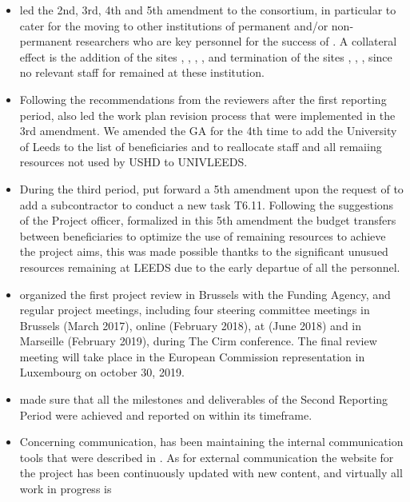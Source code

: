 \begin{itemize}
\item {} led the 2nd, 3rd, 4th and 5th amendment to the consortium,
  in particular to cater for the moving to other institutions of
  permanent and/or non-permanent researchers who are key personnel for
  the success of \ODK. A collateral effect is the addition of the
  sites , , , , and termination of the
  sites , , ,  
  since no relevant staff for \ODK remained at these institution.
\item Following the recommendations from the reviewers after the first
  reporting period,  also led the work plan revision process
  that were implemented in the 3rd amendment. We amended the GA for the 4th time to add the University of Leeds to the list of beneficiaries and  to reallocate staff and all remaiing resources not used by USHD to UNIVLEEDS. 
\item During the third period,  put forward a 5th amendment upon the request of 
to add a subcontractor to conduct a new task T6.11. 
Following the suggestions of the Project officer,  formalized 
in this 5th amendment the budget transfers between beneficiaries to optimize 
the use of remaining resources to achieve the project aims, this was made possible thantks to
the significant unusued resources remaining at LEEDS due to the early departue of all the personnel. 
\item {} organized the first project review in Brussels with
  the Funding Agency, and regular project meetings, including four
  steering committee meetings in Brussels (March 2017), online
  (February 2018),  at  (June 2018) and in Marseille (February 2019), during The Cirm conference. 
  The final review meeting will take place in the European Commission
  representation in Luxembourg on october 30, 2019.
\item {} made sure that all the milestones and deliverables of
  the Second Reporting Period were achieved and reported on within its
  timeframe.
\item Concerning communication,  has been maintaining the
  internal communication tools that were described in
  . As for external
  communication the website for the project has been continuously
  updated with new content, and virtually all work in progress is

\end{itemize}
